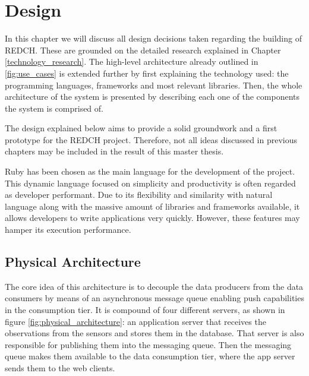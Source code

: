 \chapter{Design}

In this chapter we will discuss all design decisions taken regarding the building of REDCH. These are grounded on the detailed research explained in Chapter \ref{technology_research}. The high-level architecture already outlined in \ref{fig:use_cases} is extended further by first explaining the technology used: the programming languages, frameworks and most relevant libraries. Then, the whole architecture of the system is presented by describing each one of the components the system is comprised of.

The design explained below aims to provide a solid groundwork and a first prototype for the REDCH project. Therefore, not all ideas discussed in previous chapters may be included in the result of this master thesis.

Ruby has been chosen as the main language for the development of the project. This dynamic language focused on simplicity and productivity is often regarded as developer performant. Due to its flexibility and similarity with natural language along with the massive amount of libraries and frameworks available, it allows developers to write applications very quickly. However, these features may hamper its execution performance.

\section{Physical Architecture}

The core idea of this architecture is to decouple the data producers from the data consumers by means of an asynchronous message queue enabling push capabilities in the consumption tier. It is compound of four different servers, as shown in figure \ref{fig:physical_architecture}: an application server that receives the observations from the sensors and stores them in the database. That server is also responsible for publishing them into the messaging queue. Then the messaging queue makes them available to the data consumption tier, where the app server sends them to the web clients.

